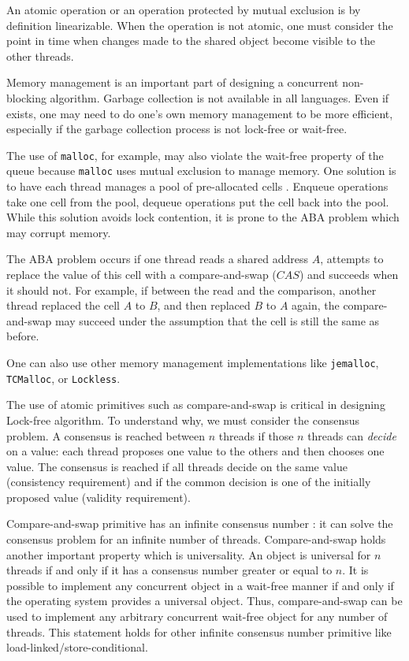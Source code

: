 An atomic operation or an operation protected by mutual exclusion is by
definition linearizable. When the operation is not atomic, one must consider the
point in time when changes made to the shared object become visible to the other
threads. \medskip

 Memory management is an important part of designing a
concurrent non-blocking algorithm. Garbage collection is not available in all
languages. Even if exists, one may need to do one's own memory management to
be more efficient, especially if the garbage collection process is not lock-free
or wait-free.

The use of \texttt{malloc}, for example, may also violate the wait-free property
of the queue because \texttt{malloc} uses mutual exclusion to manage memory. One
solution is to have each thread manages a pool of pre-allocated cells
\cite{Herlihy08}. Enqueue operations take one cell from the pool, dequeue
operations put the cell back into the pool. While this solution avoids lock
contention, it is prone to the ABA problem which may corrupt memory.

The ABA problem occurs if one thread reads a shared address $A$, attempts to
replace the value of this cell with a compare-and-swap ($CAS$) and succeeds when
it should not. For example, if between the read and the comparison, another
thread replaced the cell $A$ to $B$, and then replaced $B$ to $A$ again, the
compare-and-swap may succeed under the assumption that the cell is still the
same as before.

One can also use other memory management implementations like \texttt{jemalloc},
\texttt{TCMalloc}, or \texttt{Lockless}. \medskip

 The use of atomic primitives such as compare-and-swap is
critical in designing Lock-free algorithm. To understand why, we must consider
the consensus problem. A consensus is reached between $n$ threads if those $n$
threads can \textit{decide} on a value: each thread proposes one value to the
others and then chooses one value. The consensus is reached if all threads
decide on the same value (consistency requirement) and if the common decision is
one of the initially proposed value (validity requirement).

Compare-and-swap primitive has an infinite consensus number
\cite{Herlihy:1991:WS:114005.102808}: it can solve the consensus problem for an
infinite number of threads. Compare-and-swap holds another important property
which is universality. An object is universal for $n$ threads if and only if it
has a consensus number greater or equal to $n$. It is possible to implement any
concurrent object in a wait-free manner if and only if the operating system
provides a universal object. Thus, compare-and-swap can be used to implement any
arbitrary concurrent wait-free object for any number of threads. This statement
holds for other infinite consensus number primitive like
load-linked/store-conditional. \medskip


